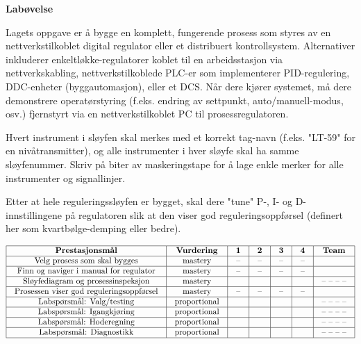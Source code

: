 

\noindent
{\bf Labøvelse}

\vskip 5pt

Lagets oppgave er å bygge en komplett, fungerende prosess som styres av en nettverkstilkoblet digital regulator eller et distribuert kontrollsystem.  Alternativer inkluderer enkeltløkke-regulatorer koblet til en arbeidsstasjon via nettverkskabling, nettverkstilkoblede PLC-er som implementerer PID-regulering, DDC-enheter (byggautomasjon), eller et DCS.  Når dere kjører systemet, må dere demonstrere operatørstyring (f.eks. endring av settpunkt, auto/manuell-modus, osv.) fjernstyrt via en nettverkstilkoblet PC til prosessregulatoren.

Hvert instrument i sløyfen skal merkes med et korrekt tag-navn (f.eks. "LT-59" for en nivåtransmitter), og alle instrumenter i hver sløyfe skal ha samme sløyfenummer.  Skriv på biter av maskeringstape for å lage enkle merker for alle instrumenter og signallinjer.

Etter at hele reguleringssløyfen er bygget, skal dere "tune" P-, I- og D-innstillingene på regulatoren slik at den viser god reguleringsoppførsel (definert her som kvartbølge-demping eller bedre).

\vskip 10pt



$$\vbox{\offinterlineskip
\halign{\strut
\vrule \quad\hfil # \ \hfil & 
\vrule \quad\hfil # \ \hfil & 
\vrule \quad\hfil # \ \hfil & 
\vrule \quad\hfil # \ \hfil & 
\vrule \quad\hfil # \ \hfil & 
\vrule \quad\hfil # \ \hfil & 
\vrule \quad\hfil # \ \hfil \vrule \cr
\noalign{\hrule}
%
{\bf Prestasjonsmål} & {\bf Vurdering} & {\bf 1} & {\bf 2} & {\bf 3} & {\bf 4} & {\bf Team} \cr
%
\noalign{\hrule}
%
Velg prosess som skal bygges & mastery & -- & -- & -- & -- & \cr
%
\noalign{\hrule}
%
Finn og naviger i manual for regulator & mastery & -- & -- & -- & -- & \cr
%
\noalign{\hrule}
%
Sløyfediagram og prosessinspeksjon & mastery & & & & & -- -- -- -- \cr
%
\noalign{\hrule}
%
Prosessen viser god reguleringsoppførsel & mastery & -- & -- & -- & -- &  \cr
%
\noalign{\hrule}
%
Labspørsmål: Valg/testing & proportional &  &  &  &  & -- -- -- -- \cr
%
\noalign{\hrule}
%
Labspørsmål: Igangkjøring & proportional &  &  &  &  & -- -- -- -- \cr
%
\noalign{\hrule}
%
Labspørsmål: Hoderegning & proportional &  &  &  &  & -- -- -- -- \cr
%
\noalign{\hrule}
%
Labspørsmål: Diagnostikk & proportional &  &  &  &  & -- -- -- -- \cr
%
\noalign{\hrule}
} %
}$$ %

